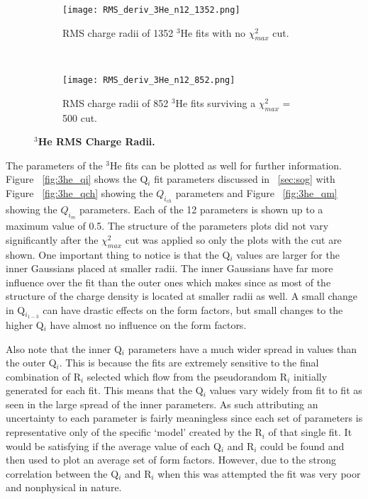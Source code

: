 \begin{figure}[!ht]
\begin{subfigure}{1.\textwidth}
  \centering
  \texttt{[image: RMS\_deriv\_3He\_n12\_1352.png]}
  \caption{RMS charge radii of 1352 $^3$He fits with no $\chi^2_{max}$ cut.}
  \label{fig:3he_rms_deriv_no_cut}
\end{subfigure}\\
\begin{subfigure}{1.\textwidth}
  \centering
  \texttt{[image: RMS\_deriv\_3He\_n12\_852.png]}
  \caption{RMS charge radii of 852 $^3$He fits surviving a $\chi^2_{max}$ = 500 cut.}
  \label{fig:3he_rms_deriv_cut}
\end{subfigure}
\caption{\bf{$^3$He RMS Charge Radii.}}
\label{fig:3he_rms_deriv}
\end{figure}

The parameters of the $^3$He fits can be plotted as well for further information. Figure ~\ref{fig:3he_qi} shows the Q$_i$ fit parameters discussed in ~\ref{sec:sog} with Figure ~\ref{fig:3he_qch} showing the $Q_{i_{ch}}$ parameters and Figure ~\ref{fig:3he_qm} showing the $Q_{i_{m}}$ parameters. Each of the 12 parameters is shown up to a maximum value of 0.5. The structure of the parameters plots did not vary significantly after the $\chi^2_{max}$ cut was applied so only the plots with the cut are shown. One important thing to notice is that the Q$_i$ values are larger for the inner Gaussians placed at smaller radii. The inner Gaussians have far more influence over the fit than the outer ones which makes since as most of the structure of the charge density is located at smaller radii as well. A small change in Q$_{i_{1-3}}$ can have drastic effects on the form factors, but small changes to the higher Q$_i$ have almost no influence on the form factors. 

Also note that the inner Q$_i$ parameters have a much wider spread in values than the outer Q$_i$. This is because the fits are extremely sensitive to the final combination of R$_i$ selected which flow from the pseudorandom R$_i$ initially generated for each fit. This means that the Q$_i$ values vary widely from fit to fit as seen in the large spread of the inner parameters. As such attributing an uncertainty to each parameter is fairly meaningless since each set of parameters is representative only of the specific `model' created by the R$_i$ of that single fit. It would be satisfying if the average value of each Q$_i$ and R$_i$ could be found and then used to plot an average set of form factors. However, due to the strong correlation between the Q$_i$ and R$_i$ when this was attempted the fit was very poor and nonphysical in nature.

